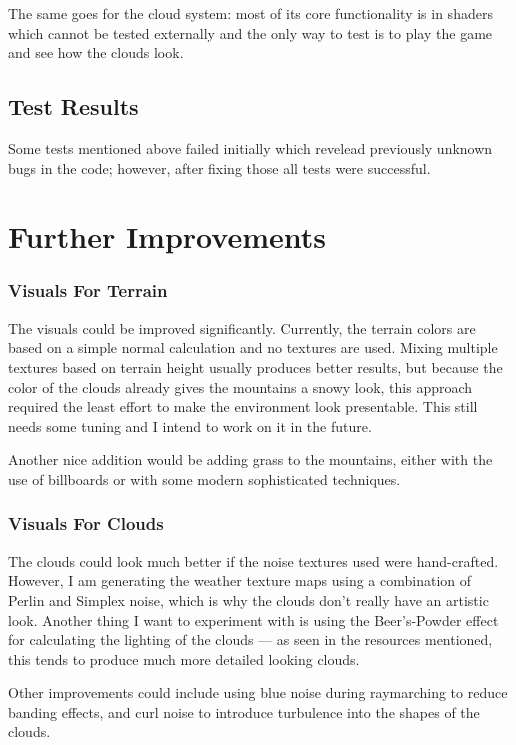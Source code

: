 The same goes for the cloud system: most of its core functionality is in shaders which cannot be tested externally and the only way to test is to play the game and see how the clouds look.

\subsection{Test Results}
Some tests mentioned above failed initially which revelead previously unknown bugs in the code; however, after fixing those all tests were successful.

\section{Further Improvements}

\subsubsection{Visuals For Terrain} The visuals could be improved significantly. Currently, the terrain colors are based on a simple normal calculation and no textures are used. Mixing multiple textures based on terrain height usually produces better results, but because the color of the clouds already gives the mountains a snowy look, this approach required the least effort to make the environment look presentable. This still needs some tuning and I intend to work on it in the future.

Another nice addition would be adding grass to the mountains, either with the use of billboards or with some modern sophisticated techniques.

\subsubsection{Visuals For Clouds} The clouds could look much better if the noise textures used were hand-crafted. However, I am generating the weather texture maps using a combination of Perlin and Simplex noise, which is why the clouds don't really have an artistic look. Another thing I want to experiment with is using the Beer's-Powder effect \cite{guerrillagames2025nubis} for calculating the lighting of the clouds — as seen in the resources mentioned, this tends to produce much more detailed looking clouds.

Other improvements could include using blue noise during raymarching to reduce banding effects, and curl noise to introduce turbulence into the shapes of the clouds.

